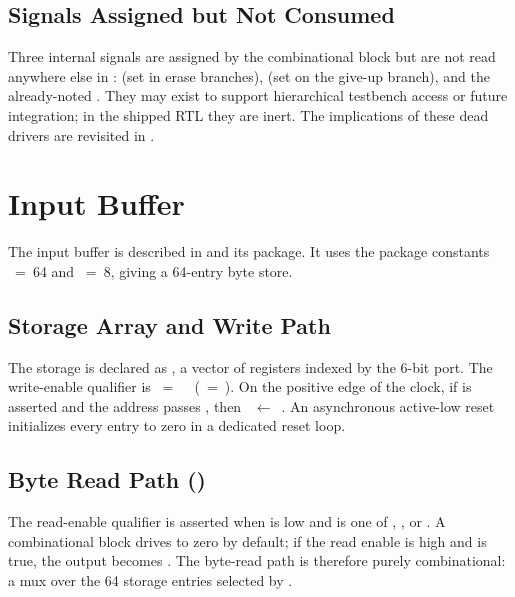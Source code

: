 \subsection{Signals Assigned but Not Consumed}
\label{sec:rtl-controller-dead}

Three internal signals are assigned by the combinational block but are
not read anywhere else in :
 (set in 
erase branches),  (set on the
 give-up branch), and the already-noted
. They may exist to support hierarchical
testbench access or future integration; in the shipped RTL they are
inert. The implications of these dead drivers are revisited in
.

\section{Input Buffer}
\label{sec:rtl-buffer}

The input buffer is described in
 and its package. It uses the
package constants ~=~64 and ~=~8,
giving a 64-entry byte store.

\subsection{Storage Array and Write Path}
\label{sec:rtl-buffer-write}

The storage is declared as
, a
vector of registers indexed by the 6-bit  port.
The write-enable qualifier is
~=~~\sv{\&\&}~(~=~).
On the positive edge of the clock, if  is asserted
and the address passes , then
~\(\leftarrow\)~. An asynchronous
active-low reset initializes every entry to zero in a dedicated reset
loop.

\subsection{Byte Read Path ()}
\label{sec:rtl-buffer-read-byte}

The read-enable qualifier is asserted when  is
low and  is one of ,
, or . A combinational
block drives  to zero by default; if the read enable
is high and  is true, the output becomes
. The byte-read path is therefore purely
combinational: a mux over the 64 storage entries selected by
.

